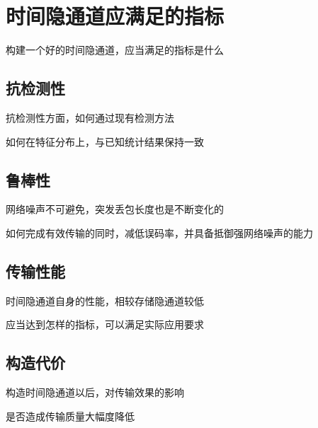 \section{时间隐通道应满足的指标}
\label{chap:backinfo:metric}

构建一个好的时间隐通道，应当满足的指标是什么

\subsection{抗检测性}
\label{chap:backinfo:metric:undetectability}

抗检测性方面，如何通过现有检测方法

如何在特征分布上，与已知统计结果保持一致

\subsection{鲁棒性}
\label{chap:backinfo:metric:robustness}

网络噪声不可避免，突发丢包长度也是不断变化的

如何完成有效传输的同时，减低误码率，并具备抵御强网络噪声的能力

\subsection{传输性能}
\label{chap:backinfo:metric:throughput}

时间隐通道自身的性能，相较存储隐通道较低

应当达到怎样的指标，可以满足实际应用要求

\subsection{构造代价}
\label{chap:backinfo:metric:cost}

构造时间隐通道以后，对传输效果的影响

是否造成传输质量大幅度降低
